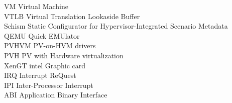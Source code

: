 \begin{tabbing}
VM  \> Virtual Machine \\
VTLB \> Virtual Translation Lookaside Buffer\\
Schism \> Static Configurator for Hypervisor-Integrated Scenario Metadata\\
QEMU \> Quick EMUlator \\
PVHVM \> PV-on-HVM drivers \\
PVH \> PV with Hardware virtualization \\
XenGT \> intel Graphic card \\
IRQ  \> Interrupt ReQuest \\
IPI \> Inter-Processor Interrupt \\
ABI \> Application Binary Interface \\
\end{tabbing}
\endinput
